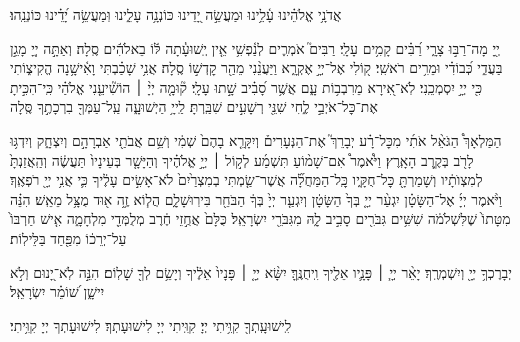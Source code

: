 \documentclass[twoside, openany, parskip=half, 11pt]{book}
\begin{document}
\veahavta

\begin{footnotesize}
\vehaya

\vayomer{}
\end{footnotesize}

\begin{small}

אֲדֹנָ֥י אֱלֹהֵ֗ינוּ עָ֫לֵ֥ינוּ וּמַעֲשֵׂ֣ה יָ֭דֵינוּ כּוֹנְנָ֥ה עָלֵ֑ינוּ וּֽמַעֲשֵׂ֥ה יָ֝דֵ֗ינוּ כּוֹנְנֵֽהוּ׃\\
\tzadialeph

יְ֖יָ מָה־רַבּ֣וּ צָרָ֑י רַ֝בִּ֗ים קָמִ֥ים עָלָֽי׃ רַבִּים֮ אֹמְרִ֢ים לְנַ֫פְשִׁ֥י אֵ֤ין יְֽשׁוּעָ֓תָה לּ֬וֹ בֵאלֹהִ֬ים סֶֽלָה׃ וְאַתָּ֣ה יְיָ֭ מָגֵ֣ן בַּעֲדִ֑י כְּ֝בוֹדִ֗י וּמֵרִ֥ים רֹאשִֽׁי׃ ק֭וֹלִי אֶל־יְיָ֣ אֶקְרָ֑א וַיַּעֲנֵ֨נִי מֵהַ֖ר קׇדְשׁ֣וֹ סֶֽלָה׃ אֲנִ֥י שָׁכַ֗בְתִּי וָאִ֫ישָׁ֥נָה הֱקִיצ֑וֹתִי כִּ֖י יְיָ֣ יִסְמְכֵֽנִי׃ לֹֽא־אִ֭ירָא מֵרִבְב֥וֹת עָ֑ם אֲשֶׁ֥ר סָ֝בִ֗יב שָׁ֣תוּ עָלָֽי׃ ק֘וּמָ֤ה יְיָ֨ ׀ הוֹשִׁ֘יעֵ֤נִי אֱלֹהַ֗י כִּֽי־הִכִּ֣יתָ אֶת־כׇּל־אֹיְבַ֣י לֶ֑חִי שִׁנֵּ֖י רְשָׁעִ֣ים שִׁבַּֽרְתָּ׃ לַֽייָ֥ הַיְשׁוּעָ֑ה עַֽל־עַמְּךָ֖ בִרְכָתֶ֣ךָ סֶּֽלָה

\hashkiveinu{}

\barukhbayom

\yerueinnu

%
הַמַּלְאָךְ֩ הַגֹּאֵ֨ל אֹתִ֜י מִכׇּל־רָ֗ע יְבָרֵךְ֮ אֶת־הַנְּעָרִים֒ וְיִקָּרֵ֤א בָהֶם֙ שְׁמִ֔י וְשֵׁ֥ם אֲבֹתַ֖י אַבְרָהָ֣ם וְיִצְחָ֑ק וְיִדְגּ֥וּ לָרֹ֖ב בְּקֶ֥רֶב הָאָֽרֶץ׃
%
וַיֹּ֩אמֶר֩ אִם־שָׁמ֨וֹעַ תִּשְׁמַ֜ע לְק֣וֹל ׀ יְיָ֣ אֱלֹהֶ֗יךָ וְהַיָּשָׁ֤ר בְּעֵינָיו֙ תַּעֲשֶׂ֔ה וְהַֽאֲזַנְתָּ֙ לְמִצְוֺתָ֔יו וְשָׁמַרְתָּ֖ כׇּל־חֻקָּ֑יו כׇּֽל־הַמַּחֲלָ֞ה אֲשֶׁר־שַׂ֤מְתִּי בְמִצְרַ֙יִם֙ לֹא־אָשִׂ֣ים עָלֶ֔יךָ כִּ֛י אֲנִ֥י יְיָ֖ רֹפְאֶֽךָ׃
%
וַיֹּ֨אמֶר יְיָ֜ אֶל־הַשָּׂטָ֗ן יִגְעַ֨ר יְיָ֤ בְּךָ֙ הַשָּׂטָ֔ן וְיִגְעַ֤ר יְיָ֙ בְּךָ֔ הַבֹּחֵ֖ר בִּירֽוּשָׁלָ֑‍ִם הֲל֧וֹא זֶ֦ה א֖וּד מֻצָּ֥ל מֵאֵֽשׁ׃
%
הִנֵּ֗ה מִטָּתוֹ֙ שֶׁלִּשְׁלֹמֹ֔ה שִׁשִּׁ֥ים גִּבֹּרִ֖ים סָבִ֣יב לָ֑הּ מִגִּבֹּרֵ֖י יִשְׂרָאֵֽל׃ כֻּלָּם֙ אֲחֻ֣זֵי חֶ֔רֶב מְלֻמְּדֵ֖י מִלְחָמָ֑ה אִ֤ישׁ חַרְבּוֹ֙ עַל־יְרֵכ֔וֹ מִפַּ֖חַד בַּלֵּילֽוֹת׃

%
יְבָרֶכְךָ֥ יְיָ֖ וְיִשְׁמְרֶֽךָ׃ יָאֵ֨ר יְיָ֧ ׀ פָּנָ֛יו אֵלֶ֖יךָ וִֽיחֻנֶּֽךָּ׃ יִשָּׂ֨א יְיָ֤ ׀ פָּנָיו֙ אֵלֶ֔יךָ וְיָשֵׂ֥ם לְךָ֖ שָׁלֽוֹם׃
%
הִנֵּ֣ה לֹֽא־יָ֭נוּם וְלֹ֣א יִישָׁ֑ן שׁ֝וֹמֵ֗ר יִשְׂרָאֵֽל׃

לִֽישׁוּעָֽתְךָ֖ קִוִּ֥יתִי יְיָ׃ קִוִּֽיתִי יְיָ לִישׁוּעָתְךָ׃ לִישׁוּעָתְךָ יְיָ קִוִּ֥יתִי׃

\adonolam \end{small}
\end{document}
